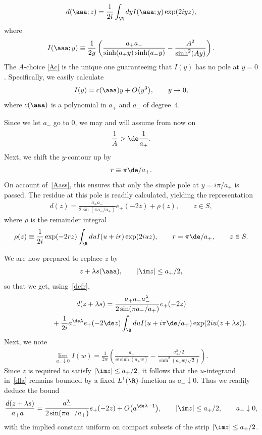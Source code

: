 \documentclass[pdftex]{sigma}
\numberwithin{equation}{section}
\begin{document}
\begin{gather}
d(\aaa;z)=\frac{1}{2i}\int_{\R}dyI(\aaa;y)\exp(2iyz),
\end{gather}
where
\begin{gather}\label{defint}
I(\aaa;y)\equiv \frac{1}{2y}\left(\frac{a_+a_-}{\sinh(a_+ y)\sinh(a_- y)}-\frac{A^2}{\sinh^2(Ay)}\right).
\end{gather}
The $A$-choice \eqref{Ac} is the unique one guaranteeing that $I(y)$ has no pole at $y=0$. Specif\/ically, we easily calculate
\begin{gather}
I(y)=c(\aaa)y+O\big(y^3\big),\qquad y\to 0,
\end{gather}
where $c(\aaa)$ is a polynomial in $a_+$ and $a_-$ of degree~4.

Since we let $a_-$ go to 0, we may and will assume from now on
\begin{gather}\label{Aass}
 \frac{1}{A} > \de \frac{1}{a_+}.
\end{gather}
Next, we shift the $y$-contour up by
\begin{gather}\label{defr}
r\equiv \pi\de/a_+.
\end{gather}
On account of~\eqref{Aass}, this ensures that only the simple pole at $y=i\pi/a_+$ is passed. The residue at this pole is readily calculated, yielding the representation
\begin{gather}
d(z)=\frac{a_+a_-}{2\sin(\pi a_-/a_+)}e_+(-2z)+\rho(z), \qquad z\in S,
\end{gather}
where $\rho$ is the remainder integral
\begin{gather}
\rho(z)\equiv \frac{1}{2i}\exp(-2rz)\int_{\R}duI(u+ir)\exp(2iuz),\qquad r=\pi\de/a_+,\qquad z\in S.
\end{gather}

We are now prepared to replace $z$ by
\begin{gather}
z+\lambda s(\aaa),\qquad |\im z|\le a_+/2,
\end{gather}
so that we get, using~\eqref{defr},
\begin{gather}
d(z+\lambda s)=\frac{a_+a_-a_-^{\lambda}}{2\sin (\pi a_-/a_+)}e_+(-2z)\nonumber\\
\phantom{d(z+\lambda s)=}{}
+\frac{1}{2i}a_-^{\de\lambda}e_+(-2\de z)\int_{\R}duI(u+i\pi \de/a_+)\exp(2iu(z+\lambda s)).\label{dla}
\end{gather}
Next, we note
\begin{gather}
\lim_{a_-\downarrow 0}I(w)=\frac{1}{2w}\left( \frac{a_+}{w\sinh(a_+w)}-\frac{a^2_+/2}{\sinh^2(a_+w/\sqrt{2})}\right).
\end{gather}
Since $z$ is required to satisfy $|\im z|\le a_+/2$, it follows that the $u$-integrand in~\eqref{dla} remains bounded by a f\/ixed $L^1(\R)$-function as $a_-\downarrow 0$. Thus we readily deduce the bound{\samepage
\begin{gather}\label{dlim}
\frac{d(z+\lambda s)}{a_+a_-}=\frac{a_-^{\lambda }}{2\sin(\pi a_-/a_+)}
e_+(- 2z)+O\big(a_-^{\de\lambda -1}\big),\qquad |\im z|\le a_+/2,\qquad
 a_-\downarrow 0,
\end{gather}
with the implied constant uniform on compact subsets of the strip $|\im z|\le a_+/2$.}
\end{document}
